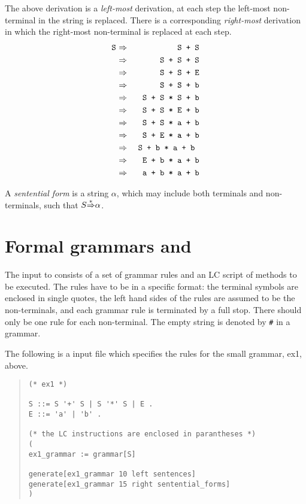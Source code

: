 The above derivation is a {\em left-most} derivation, at each step the
left-most non-terminal in the string is replaced. There is a
corresponding {\em right-most} derivation in which the right-most
non-terminal is replaced at each step.
\begin{eqnarray*}
\mbox{\tt
S} &{\ \mathop{\Rightarrow}\limits^{}\ }& \mbox{\tt S + S} \\
  &{\ \mathop{\Rightarrow}\limits^{}\ }& \mbox{\tt S + S + S} \\
  &{\ \mathop{\Rightarrow}\limits^{}\ }& \mbox{\tt S + S + E} \\
  &{\ \mathop{\Rightarrow}\limits^{}\ }& \mbox{\tt S + S + b} \\
  &{\ \mathop{\Rightarrow}\limits^{}\ }& \mbox{\tt S + S * S + b}\\ 
  &{\ \mathop{\Rightarrow}\limits^{}\ }& \mbox{\tt S + S * E + b} \\
  &{\ \mathop{\Rightarrow}\limits^{}\ }& \mbox{\tt S + S * a + b} \\
  &{\ \mathop{\Rightarrow}\limits^{}\ }& \mbox{\tt S + E * a + b} \\
  &{\ \mathop{\Rightarrow}\limits^{}\ }& \mbox{\tt S + b * a + b }\\
  &{\ \mathop{\Rightarrow}\limits^{}\ }& \mbox{\tt E + b * a + b} \\
  &{\ \mathop{\Rightarrow}\limits^{}\ }& \mbox{\tt a + b * a + b} \\
\end{eqnarray*}

A {\em sentential form} is a string $\alpha$, 
which may include both terminals and non-terminals, such that 
$S{\mathop{\Rightarrow}\limits^*}\alpha$. 

\section{Formal grammars and \gtb}

The input to \gtb consists of a set of grammar rules and an LC script of
methods to be executed. The rules have to be in a specific format:
the terminal symbols are enclosed in single quotes, the left hand
sides of the rules are assumed to be the non-terminals, and each grammar
rule is terminated by a full stop. There should only be one rule for
each non-terminal. The empty string is denoted by \verb&#& in a \gtb
grammar.


The following is a \gtb input file which specifies the rules for the
small grammar, ex1, above. 
\begin{quote}\label{p_ex1}
\begin{verbatim}
(* ex1 *)

S ::= S '+' S | S '*' S | E .
E ::= 'a' | 'b' .

(* the LC instructions are enclosed in parantheses *)
(
ex1_grammar := grammar[S]  

generate[ex1_grammar 10 left sentences]
generate[ex1_grammar 15 right sentential_forms]
)
\end{verbatim}
\end{quote}

